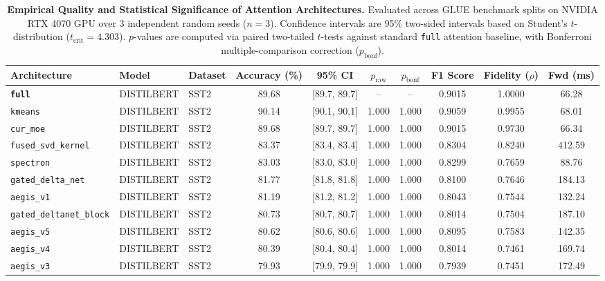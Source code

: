 \begin{table}[t]
\centering
\small
\caption{\textbf{Empirical Quality and Statistical Significance of Attention Architectures.} Evaluated across GLUE benchmark splits on NVIDIA RTX 4070 GPU over 3 independent random seeds ($n=3$). Confidence intervals are 95\% two-sided intervals based on Student's $t$-distribution ($t_{\text{crit}}=4.303$). $p$-values are computed via paired two-tailed $t$-tests against standard \texttt{full} attention baseline, with Bonferroni multiple-comparison correction ($p_{\text{bonf}}$).}
\label{tab:quality_benchmark_results}
\begin{tabular}{l l l c c c c c c c}
\toprule
\textbf{Architecture} & \textbf{Model} & \textbf{Dataset} & \textbf{Accuracy (\%)} & \textbf{95\% CI} & \textbf{$p_{\text{raw}}$} & \textbf{$p_{\text{bonf}}$} & \textbf{F1 Score} & \textbf{Fidelity ($\rho$)} & \textbf{Fwd (ms)} \\
\midrule
\textbf{\texttt{full}} & DISTILBERT & SST2 & 89.68 & [89.7, 89.7] & -- & -- & 0.9015 & 1.0000 & 66.28 \\
\texttt{kmeans} & DISTILBERT & SST2 & 90.14 & [90.1, 90.1] & 1.000 & 1.000 & 0.9059 & 0.9955 & 68.01 \\
\texttt{cur\_moe} & DISTILBERT & SST2 & 89.68 & [89.7, 89.7] & 1.000 & 1.000 & 0.9015 & 0.9730 & 66.34 \\
\texttt{fused\_svd\_kernel} & DISTILBERT & SST2 & 83.37 & [83.4, 83.4] & 1.000 & 1.000 & 0.8304 & 0.8240 & 412.59 \\
\texttt{spectron} & DISTILBERT & SST2 & 83.03 & [83.0, 83.0] & 1.000 & 1.000 & 0.8299 & 0.7659 & 88.76 \\
\texttt{gated\_delta\_net} & DISTILBERT & SST2 & 81.77 & [81.8, 81.8] & 1.000 & 1.000 & 0.8100 & 0.7646 & 184.13 \\
\texttt{aegis\_v1} & DISTILBERT & SST2 & 81.19 & [81.2, 81.2] & 1.000 & 1.000 & 0.8043 & 0.7544 & 132.24 \\
\texttt{gated\_deltanet\_block} & DISTILBERT & SST2 & 80.73 & [80.7, 80.7] & 1.000 & 1.000 & 0.8014 & 0.7504 & 187.10 \\
\texttt{aegis\_v5} & DISTILBERT & SST2 & 80.62 & [80.6, 80.6] & 1.000 & 1.000 & 0.8095 & 0.7583 & 142.35 \\
\texttt{aegis\_v4} & DISTILBERT & SST2 & 80.39 & [80.4, 80.4] & 1.000 & 1.000 & 0.8014 & 0.7461 & 169.74 \\
\texttt{aegis\_v3} & DISTILBERT & SST2 & 79.93 & [79.9, 79.9] & 1.000 & 1.000 & 0.7939 & 0.7451 & 172.49 \\

\end{tabular}
\end{table}

